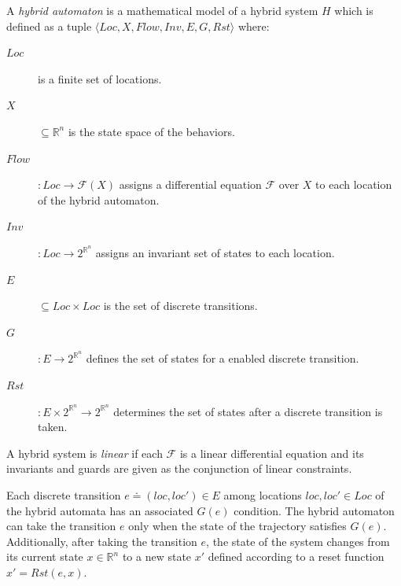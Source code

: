 
\begin{definition}
\label{def:hybridSystem}
 A \emph{hybrid automaton} is a mathematical model of a hybrid system $H$ which is defined as a tuple $\langle Loc, X, Flow, Inv, E, G, Rst \rangle$ where:
\begin{description}
\item[$Loc$] is a finite set of locations.
\item[$X$] $\subseteq \mathbb{R}^n$ is the state space of the behaviors.
\item[$Flow$] $: Loc \rightarrow \mathcal{F}(X)$ assigns a  differential equation $\mathcal{F}$ over $X$ to each location of the hybrid automaton.
\item[$Inv$] $: Loc \rightarrow 2^{\mathbb{R}^n}$ assigns an invariant set of states to each location.
\item[$E$] $\subseteq Loc \times Loc$ is the set of discrete transitions.
\item[$G$] $: E \rightarrow 2^{\mathbb{R}^n}$ defines the set of states for a enabled discrete transition.
\item[$Rst$] $: E \times 2^{\mathbb{R}^n} \rightarrow 2^{\mathbb{R}^n}$ determines the set of states after a discrete  transition is taken.
\end{description}
A hybrid system is \emph{linear} if each $\mathcal{F}$ is a linear differential equation and its invariants and guards are given as the conjunction of linear constraints.
\end{definition}

%
Each discrete transition $e \doteq (loc, loc') \in E$ among locations  $loc, loc' \in Loc$ of the hybrid automata has an associated $G(e)$ condition. The hybrid automaton can take the transition $e$ only when the state of the trajectory satisfies $G(e)$.
%
Additionally, after taking the transition $e$, the state of the system changes from its current state $x \in \mathbb{R}^n$ to a new state $x'$ defined according to a reset function $x' = Rst(e,x)$.
%


